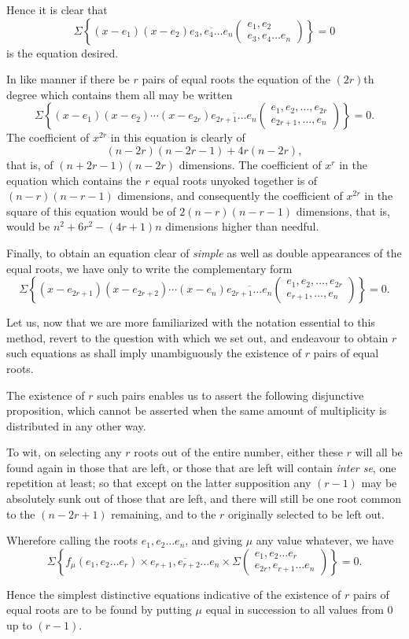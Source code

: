 \documentclass[11pt]{article}
\newcommand{\sourcepage}[1]{\marginpar{\scriptsize p.~#1}}
\newcommand{\rowparen}[2]{\left(\begin{matrix}#1\\#2\end{matrix}\right)}
\newcommand{\pgram}[1]{\overline{#1}}
\begin{document}
\sourcepage{73}
Hence it is clear that
\[
\Sigma\left\{(x-e_1)(x-e_2)\pgram{e_3,e_4\ldots e_n}
 \rowparen{e_1,e_2}{e_3,e_4\ldots e_n}\right\}=0
\]
is the equation desired.

In like manner if there be $r$ pairs of equal roots the equation of the $(2r)$th degree which contains them all may be written
\[
\Sigma\left\{(x-e_1)(x-e_2)\cdots(x-e_{2r})
\pgram{e_{2r+1}\ldots e_n}
\rowparen{e_1,e_2,\ldots,e_{2r}}{e_{2r+1},\ldots,e_n}\right\}=0.
\]
The coefficient of $x^{2r}$ in this equation is clearly of
\[
 (n-2r)(n-2r-1)+4r(n-2r),
\]
that is, of $(n+2r-1)(n-2r)$ dimensions. The coefficient of $x^r$ in the equation which contains the $r$ equal roots unyoked together is of $(n-r)(n-r-1)$ dimensions, and consequently the coefficient of $x^{2r}$ in the square of this equation would be of $2(n-r)(n-r-1)$ dimensions, that is, would be $n^2+6r^2-(4r+1)n$ dimensions higher than needful.

Finally, to obtain an equation clear of \emph{simple} as well as double appearances of the equal roots, we have only to write the complementary form
\[
\Sigma\left\{(x-e_{2r+1})(x-e_{2r+2})\cdots(x-e_n)
\pgram{e_{2r+1}\ldots e_n}
\rowparen{e_1,e_2,\ldots,e_{2r}}{e_{r+1},\ldots,e_n}\right\}=0.
\]

Let us, now that we are more familiarized with the notation essential to this method, revert to the question with which we set out, and endeavour to obtain $r$ such equations as shall imply unambiguously the existence of $r$ pairs of equal roots.

The existence of $r$ such pairs enables us to assert the following disjunctive proposition, which cannot be asserted when the same amount of multiplicity is distributed in any other way.

To wit, on selecting any $r$ roots out of the entire number, either these $r$ will all be found again in those that are left, or those that are left will contain \emph{inter se}, one repetition at least; so that except on the latter supposition any $(r-1)$ may be absolutely sunk out of those that are left, and there will still be one root common to the $(n-2r+1)$ remaining, and to the $r$ originally selected to be left out.

Wherefore calling the roots $e_1,e_2\ldots e_n$, and giving $\mu$ any value whatever, we have
\[
\Sigma\left\{f_\mu(e_1,e_2\ldots e_r)
 \times \pgram{e_{r+1},e_{r+2}\ldots e_n}
 \times \Sigma\rowparen{e_1,e_2\ldots e_r}{e_{2r},e_{r+1}\ldots e_n}
 \right\}=0.
\]

\sourcepage{74}
Hence the simplest distinctive equations indicative of the existence of $r$ pairs of equal roots are to be found by putting $\mu$ equal in succession to all values from $0$ up to $(r-1)$.
\end{document}
